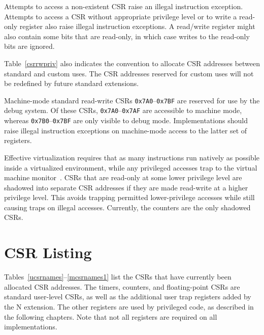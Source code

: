 Attempts to access a non-existent CSR raise an illegal instruction
exception.  Attempts to access a CSR without appropriate privilege
level or to write a read-only register also raise illegal instruction
exceptions.  A read/write register might also contain some bits that
are read-only, in which case writes to the read-only bits are ignored.

Table~\ref{csrrwpriv} also indicates the convention to allocate CSR
addresses between standard and custom uses.  The CSR addresses
reserved for custom uses will not be redefined by future
standard extensions.

Machine-mode standard read-write CSRs {\tt 0x7A0}--{\tt 0x7BF} are reserved
for use by the debug system.  Of these CSRs, {\tt 0x7A0}--{\tt 0x7AF} are
accessible to machine mode, whereas {\tt 0x7B0}--{\tt 0x7BF} are only visible
to debug mode.  Implementations should raise illegal instruction exceptions on
machine-mode access to the latter set of registers.

\begin{commentary}
Effective virtualization requires that as many instructions run natively as
possible inside a virtualized environment, while any privileged accesses trap
to the virtual machine monitor~\cite{goldbergvm}.  CSRs that are read-only at
some lower privilege level are shadowed into separate CSR addresses if they
are made read-write at a higher privilege level.  This avoids trapping
permitted lower-privilege accesses while still causing traps on illegal
accesses.  Currently, the counters are the only shadowed CSRs.
\end{commentary}

\section{CSR Listing}

Tables~\ref{ucsrnames}--\ref{mcsrnames1} list the CSRs that have
currently been allocated CSR addresses.  The timers, counters, and
floating-point CSRs are standard user-level CSRs, as well as the
additional user trap registers added by the N extension.  The other
registers are used by privileged code, as described in the following
chapters.  Note that not all registers are required on all
implementations.

